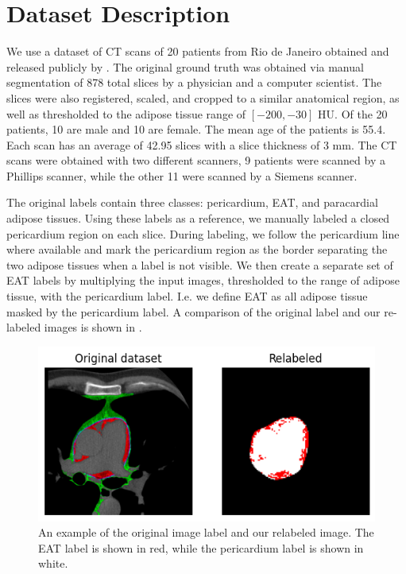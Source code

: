 \section{Dataset Description}\label{data}

We use a dataset of CT scans of 20 patients from Rio de Janeiro obtained and released publicly by \citet{Rodrigues2016}. The original ground truth was obtained via manual segmentation of 878 total slices by a physician and a computer scientist. The slices were also registered, scaled, and cropped to a similar anatomical region, as well as thresholded to the adipose tissue range of $[-200, -30]$ HU. Of the 20 patients, 10 are male and 10 are female. The mean age of the patients is 55.4. Each scan has an average of 42.95 slices with a slice thickness of 3 mm. The CT scans were obtained with two different scanners, 9 patients were scanned by a Phillips scanner, while the other 11 were scanned by a Siemens scanner.

The original labels contain three classes: pericardium, EAT, and paracardial adipose tissues. Using these labels as a reference, we manually labeled a closed pericardium region on each slice. During labeling, we follow the pericardium line where available and mark the pericardium region as the border separating the two adipose tissues when a label is not visible. We then create a separate set of EAT labels by multiplying the input images, thresholded to the range of adipose tissue, with the pericardium label. I.e. we define EAT as all adipose tissue masked by the pericardium label. A comparison of the original label and our re-labeled images is shown in .

\begin{figure}[t!]
    \centering
    \includegraphics[width=0.65\columnwidth]{images/6/relabel}
    \caption{An example of the original image label and our relabeled image. The EAT label is shown in red, while the pericardium label is shown in white. \cite{bencevicEpicardialAdiposeTissue2021}}
    \label{fig:dataset-relabel}
\end{figure}

